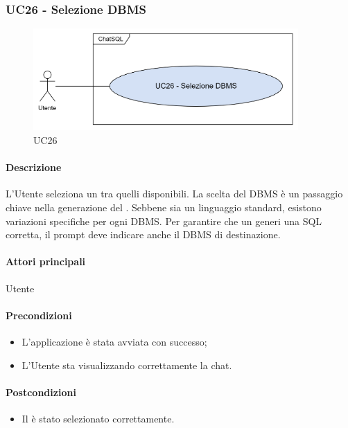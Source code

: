 \subsubsection{UC26 - Selezione DBMS}\label{UC26}

\begin{figure}[H]
  \centering
  \includegraphics[width=0.90\textwidth]{assets/uc26.png}
  \caption{UC26}
\end{figure}

\paragraph*{Descrizione}
L'Utente seleziona un  tra quelli disponibili. La scelta del DBMS è un passaggio chiave nella generazione del . Sebbene  sia un linguaggio standard, esistono variazioni specifiche per ogni DBMS. Per garantire che un  generi una  SQL corretta, il prompt deve indicare anche il DBMS di destinazione.

\paragraph*{Attori principali}
Utente

\paragraph*{Precondizioni}
\begin{itemize}
  \item L'applicazione è stata avviata con successo;
  \item L'Utente sta visualizzando correttamente la chat.
\end{itemize}

\paragraph*{Postcondizioni}
\begin{itemize}
  \item Il  è stato selezionato correttamente.
\end{itemize}

